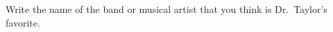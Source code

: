 \showpoints

\bonusquestion[2]
Write the name of the band or musical artist that you think is Dr.~Taylor's favorite. 

